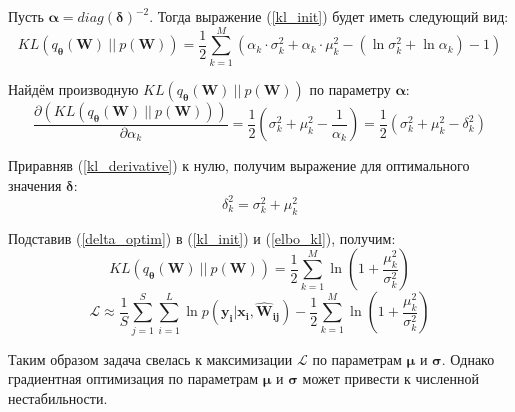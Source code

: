 \documentclass{article}
\numberwithin{equation}{section}
\begin{document}
    Пусть $\pmb{\alpha} = diag(\pmb{\delta})^{-2}$.
    Тогда выражение (\ref{kl_init}) будет иметь следующий вид:
    \begin{equation}\label{kl_init_alpha}
        KL(
            q_{\pmb{\theta}}(\pmb{W})~||~p(\pmb{W})
        )
        =
            \frac{1}{2} \sum_{k=1}^{M} \left(
                \alpha_{k} \cdot \sigma_{k}^2
                + \alpha_{k} \cdot \mu_{k}^2
                - (\ln{\sigma_{k}^2} + \ln{\alpha_{k}})
                - 1
            \right)
    \end{equation}

    Найдём производную $KL(q_{\pmb{\theta}}(\pmb{W})~||~p(\pmb{W}))$ по параметру $\pmb{\alpha}$:
    \begin{equation}\label{kl_derivative}
        \frac
            {\partial (KL(q_{\pmb{\theta}}(\pmb{W})~||~p(\pmb{W})))}
            {\partial {\alpha_k}}
        =
            \frac{1}{2} \left(
                \sigma_{k}^2 + \mu_{k}^2 - \dfrac{1}{\alpha_k}
            \right)
        =
            \frac{1}{2} \left(
                \sigma_{k}^2 + \mu_{k}^2 - \delta_{k}^2
            \right)
    \end{equation}

    Приравняв (\ref{kl_derivative}) к нулю, получим выражение для оптимального значения $\pmb{\delta}$:
    \begin{equation}\label{delta_optim}
        \delta_{k}^2 = \sigma_{k}^2 + \mu_{k}^2
    \end{equation}

    Подставив (\ref{delta_optim}) в (\ref{kl_init}) и (\ref{elbo_kl}), получим:
    \begin{equation}\label{kl_optim}
    KL(
        q_{\pmb{\theta}}(\pmb{W})~||~p(\pmb{W})
    )
    =
        \frac{1}{2} \sum_{k=1}^{M} {
            \ln \left(
                {1 + \frac{\mu_{k}^2}{\sigma_{k}^2}}
            \right)
        }
    \end{equation}
    \begin{equation}\label{elbo_kl_optim}
        \mathcal{L}
        \approx
            \frac{1}{S} \sum_{j=1}^S \sum_{i=1}^{L} {
                \ln{
                    p(\pmb{y_{i}} | \pmb{x_{i}}, \pmb{\hat{W}_{ij}})
                }
            }
        -
            \frac{1}{2} \sum_{k=1}^{M} {
                \ln \left(
                    {1 + \frac{\mu_{k}^2}{\sigma_{k}^2}}
                \right)
            }
    \end{equation}

    Таким образом задача свелась к максимизации $\mathcal{L}$
    по параметрам $\pmb{\mu}$ и $\pmb{\sigma}$.
    Однако градиентная оптимизация по параметрам $\pmb{\mu}$ и $\pmb{\sigma}$ может привести
    к численной нестабильности.
\end{document}
